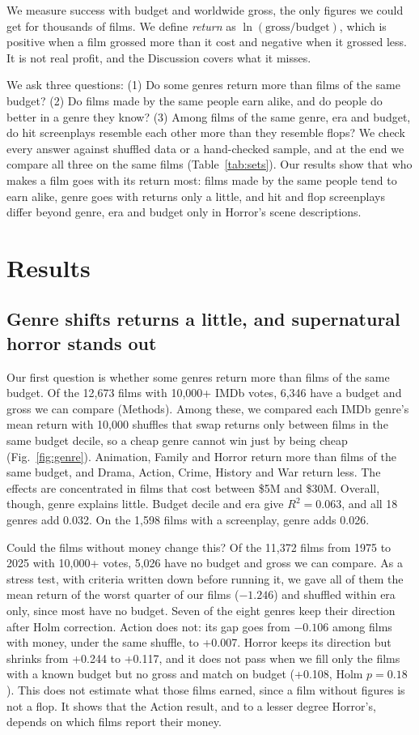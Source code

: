\documentclass[9pt,twocolumn,twoside]{pnas-new}
\begin{document}
We measure success with budget and worldwide gross, the only figures we could get for thousands of films. We define \emph{return} as $\ln(\text{gross}/\text{budget})$, which is positive when a film grossed more than it cost and negative when it grossed less. It is not real profit, and the Discussion covers what it misses.

We ask three questions: (1) Do some genres return more than films of the same budget? (2) Do films made by the same people earn alike, and do people do better in a genre they know? (3) Among films of the same genre, era and budget, do hit screenplays resemble each other more than they resemble flops? We check every answer against shuffled data or a hand-checked sample, and at the end we compare all three on the same films (Table~\ref{tab:sets}). Our results show that who makes a film goes with its return most: films made by the same people tend to earn alike, genre goes with returns only a little, and hit and flop screenplays differ beyond genre, era and budget only in Horror's scene descriptions.

\section*{Results}

\subsection*{Genre shifts returns a little, and supernatural horror stands out}
Our first question is whether some genres return more than films of the same budget.
Of the 12,673 films with 10,000+ IMDb votes, 6,346 have a budget and gross we can compare (Methods). Among these, we compared each IMDb genre's mean return with 10,000 shuffles that swap returns only between films in the same budget decile, so a cheap genre cannot win just by being cheap (Fig.~\ref{fig:genre}). Animation, Family and Horror return more than films of the same budget, and Drama, Action, Crime, History and War return less. The effects are concentrated in films that cost between \$5M and \$30M. Overall, though, genre explains little. Budget decile and era give $R^2=0.063$, and all 18 genres add 0.032. On the 1,598 films with a screenplay, genre adds 0.026.

Could the films without money change this? Of the 11,372 films from 1975 to 2025 with 10,000+ votes, 5,026 have no budget and gross we can compare. As a stress test, with criteria written down before running it, we gave all of them the mean return of the worst quarter of our films ($-1.246$) and shuffled within era only, since most have no budget. Seven of the eight genres keep their direction after Holm correction. Action does not: its gap goes from $-0.106$ among films with money, under the same shuffle, to +0.007. Horror keeps its direction but shrinks from +0.244 to +0.117, and it does not pass when we fill only the films with a known budget but no gross and match on budget (+0.108, Holm $p=0.18$). This does not estimate what those films earned, since a film without figures is not a flop. It shows that the Action result, and to a lesser degree Horror's, depends on which films report their money.
\end{document}
